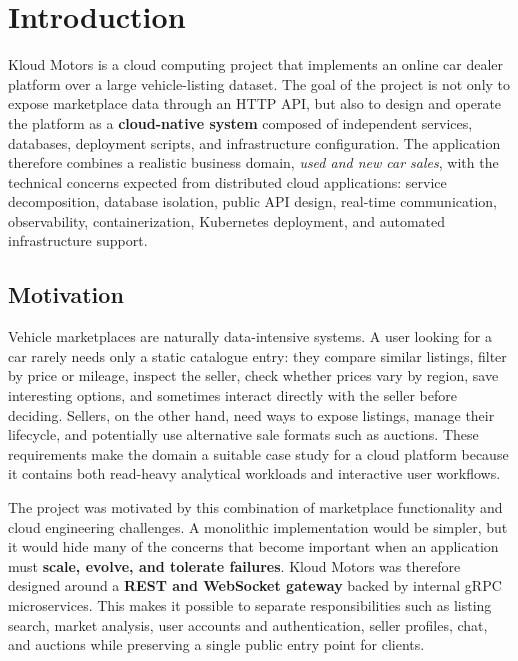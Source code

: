 \chapter{Introduction} \label{chap:introduction}

Kloud Motors is a cloud computing project that implements an online car dealer platform over a large vehicle-listing dataset. The goal of the project is not only to expose marketplace data through an HTTP API, but also to design and operate the platform as a \textbf{cloud-native system} composed of independent services, databases, deployment scripts, and infrastructure configuration. The application therefore combines a realistic business domain, \textit{used and new car sales}, with the technical concerns expected from distributed cloud applications: service decomposition, database isolation, public API design, real-time communication, observability, containerization, Kubernetes deployment, and automated infrastructure support.

\section{Motivation}

Vehicle marketplaces are naturally data-intensive systems. A user looking for a car rarely needs only a static catalogue entry: they compare similar listings, filter by price or mileage, inspect the seller, check whether prices vary by region, save interesting options, and sometimes interact directly with the seller before deciding. Sellers, on the other hand, need ways to expose listings, manage their lifecycle, and potentially use alternative sale formats such as auctions. These requirements make the domain a suitable case study for a cloud platform because it contains both read-heavy analytical workloads and interactive user workflows.

The project was motivated by this combination of marketplace functionality and cloud engineering challenges. A monolithic implementation would be simpler, but it would hide many of the concerns that become important when an application must \textbf{scale, evolve, and tolerate failures}. Kloud Motors was therefore designed around a \textbf{REST and WebSocket gateway} backed by internal gRPC microservices. This makes it possible to separate responsibilities such as listing search, market analysis, user accounts and authentication, seller profiles, chat, and auctions while preserving a single public entry point for clients.


